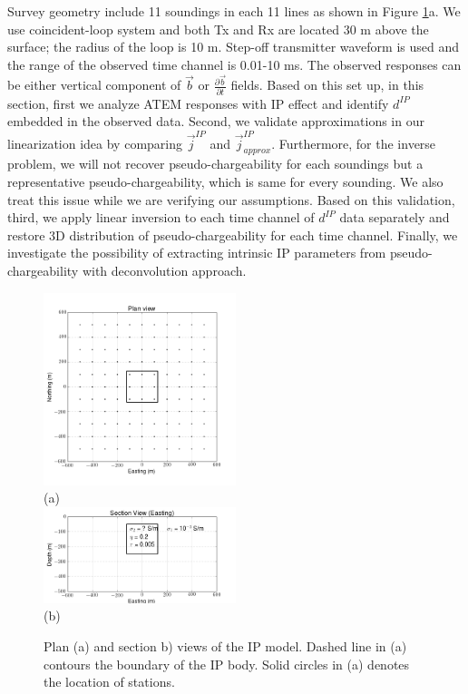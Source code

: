\documentclass[a4paper, 11pt]{article}
\renewcommand {\j}  { {\vec j} }
\renewcommand {\b}  { {\vec b} }
\newcommand{\dip}{d^{IP}}
\begin{document}
Survey geometry include 11 soundings in each 11 lines as shown in Figure \ref{F: IPModel}a. We use coincident-loop system and both Tx and Rx are located 30 m above the surface; the radius of the loop is 10 m. Step-off transmitter waveform is used and the range of the observed time channel is 0.01-10 ms. The observed responses can be either vertical component of $\b$ or $\frac{\partial \b}{\partial t}$ fields. Based on this set up, in this section, first we analyze ATEM responses with IP effect and identify $\dip$ embedded in the observed data. Second, we validate approximations in our linearization idea by comparing $\j^{IP}$ and $\j^{IP}_{approx}$. Furthermore, for the inverse problem, we will not recover pseudo-chargeability for each soundings but a representative pseudo-chargeability, which is same for every sounding. We also treat this issue while we are verifying our assumptions. 
Based on this validation, third, we apply linear inversion to each time channel of $\dip$ data separately and restore 3D distribution of pseudo-chargeability for each time channel. Finally, we investigate the possibility of extracting intrinsic IP parameters from pseudo-chargeability with deconvolution approach. 

\begin{figure}[htb]
  \centering
  \includegraphics[width=0.5\textwidth]{figures/threecasesresp/Planview.png} \\
  (a) \\
  \includegraphics[width=0.5\textwidth]{figures/threecasesresp/Sectionview.png} \\
  (b)
  \caption{Plan (a) and section b) views of the IP model. Dashed line in (a) contours the boundary of the IP body. Solid circles in (a) denotes the location of stations.}
  \label{F: IPModel}
\end{figure}
\clearpage
\end{document}
